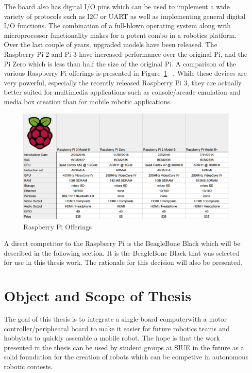 \documentclass[12pt,oneside,final]{siuethesis}
\theoremstyle{definition}
\begin{document}
The board also has digital I/O pins which can be used to implement a wide variety of protocols such as I2C or UART as well as implementing general digital I/O functions. The combination of a full-blown operating system along with microprocessor functionality makes for a potent combo in a robotics platform. Over the last couple of years, upgraded models have been released. The Raspberry Pi 2 and  Pi 3  have increased performance over the original Pi, and the Pi Zero which is less than half the size of the original Pi. A comparison of the various Raspberry Pi offerings is presented in Figure~\ref{fig:Pi_offer} ~\cite{RPi3}. While these devices are very powerful, especially the recently released Raspberry Pi 3, they are actually better suited for multimedia applications such as console/arcade emulation and media box creation than for mobile robotic applications.

\begin{figure}[htbp!]
\centering
\includegraphics[scale=.4,keepaspectratio=true]{./images/pispecs2.png}
\caption{Raspberry Pi Offerings }
\label{fig:Pi_offer}
\end{figure}


A direct competitor to the Raspberry Pi is the BeagleBone Black which will be described in the following section.  It is the BeagleBone Black that was selected for use in this thesis work. The rationale for this decision will also be presented.

 


\section{Object and Scope of Thesis}

The goal of this thesis is to integrate a single-board computerwith a motor controller/periphearal board to make it easier for future robotics teams and hobbyists to quickly assemble a mobile robot. The hope is that the work presented in the thesis can be used by student groups at SIUE in the future as a solid foundation for the creation of robots which can be competive in  autonomous robotic contests.
\end{document}
